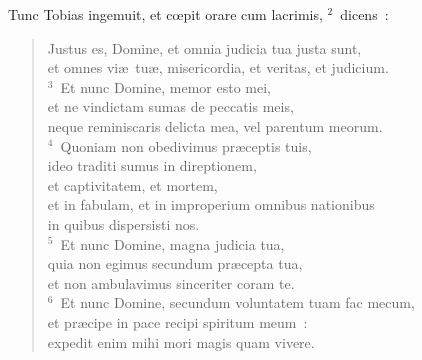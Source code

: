 \lettrine[lines=10,image=true,loversize=0.05,lraise=-0.03]{T}{}unc Tobias ingemuit, et cœpit orare cum lacrimis,
${}^{2}$~dicens~: \begin{flushleft}\begin{verse}Justus es, Domine, et omnia judicia tua justa sunt,\\ et omnes vi\ae\ tu\ae , misericordia, et veritas, et judicium.\\
${}^{3}$~Et nunc Domine, memor esto mei,\\ et ne vindictam sumas de peccatis meis,\\ neque reminiscaris delicta mea, vel parentum meorum.\\
${}^{4}$~Quoniam non obedivimus pr\ae ceptis tuis,\\ ideo traditi sumus in direptionem,\\ et captivitatem, et mortem,\\ et in fabulam, et in improperium omnibus nationibus\\ in quibus dispersisti nos.\\
${}^{5}$~Et nunc Domine, magna judicia tua,\\ quia non egimus secundum pr\ae cepta tua,\\ et non ambulavimus sinceriter coram te.\\
${}^{6}$~Et nunc Domine, secundum voluntatem tuam fac mecum,\\ et pr\ae cipe in pace recipi spiritum meum~:\\ expedit enim mihi mori magis quam vivere.\end{verse}\end{flushleft}


